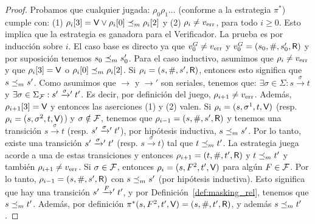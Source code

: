 \begin{proof}
	Probamos que cualquier jugada: $\rho_0 \rho_1 \dots$ (conforme a la estrategia $\pi^*$) cumple con: 
	(1) $\pr{3}{\rho_i}=\Verifier \vee \pr{0}{\rho_i} \Masking \pr{2}{\rho_i}$ y 
	(2) $\rho_i \neq \ErrorSt$, para todo $i\geq 0$. Esto implica que la estrategia es ganadora para el Verificador. 
La prueba es por inducción sobre $i$. El caso base es directo ya que 
$\InitVertex^G \neq \ErrorSt$ y $\InitVertex^G = (\InitState, \#, \InitStatePrime, \Refuter)$ y por suposición tenemos $\InitState \Masking \InitStatePrime$. Para el caso inductivo, asumimos que 
$\rho_i \neq \ErrorSt$ y que $\pr{3}{\rho_i} = \Verifier$ o $\pr{0}{\rho_i} \Masking \pr{2}{\rho_i}$. 
Si $\rho_i = (s, \#, s', \Refuter)$, entonces esto significa que $s \Masking s'$. Como asumimos que
$\rightarrow$ y $\rightarrow'$ son seriales, tenemos que: $\exists \sigma \in \Sigma: s \xrightarrow{\sigma} t$ y $\exists \sigma \in \SigmaF : s' \xrightarrowprime{\sigma} t'$. Es decir, por definición del juego, $\rho_{i+1} \neq \ErrorSt$. 
Además, $\pr{3}{\rho_{i+1}} = \Verifier$ y entonces las aserciones (1) y (2) valen. 
Si $\rho_i = (s, \sigma^1, t, \Verifier)$ (resp. $\rho_i = (s, \sigma^2, t, \Verifier)$) y $\sigma \notin \Faults$,
tenemos que $\rho_{i-1} = (s, \#, s', \Refuter)$ y tenemos una transición $s \xrightarrow{\sigma} t$ (resp. $s' \xrightarrowprime{\sigma} t'$), por hipótesis inductiva, $s \Masking s'$. 
Por lo tanto, existe una transición $s' \xrightarrowprime{\sigma} t'$ (resp.  $s \xrightarrow{\sigma} t$) tal que $t \Masking t'$. 
La estrategia juega acorde a una de estas transiciones y entonces
$\rho_{i+1} = (t, \#, t', \Refuter)$ y $t \Masking t'$ y también $\rho_{i+1} \neq \ErrorSt$. Si $\sigma \in \Faults$, entonces $\rho_i = (s, F^2, t', \Verifier)$ para algún $F \in \Faults$. 
Por lo tanto, $\rho_{i-1} = (s, \#, s', \Refuter)$ con $s \Masking s'$ (por hipótesis inductiva). Esto significa que hay una transición $s' \xrightarrowprime{F} t'$, y por Definición~\ref{def:masking_rel},
tenemos que $s \Masking t'$. Además, por definición $\pi^*(s, F^2, t', \Verifier) = (s, \#,t',\Refuter)$, 
y además $s \Masking t'$. 


\end{proof}
